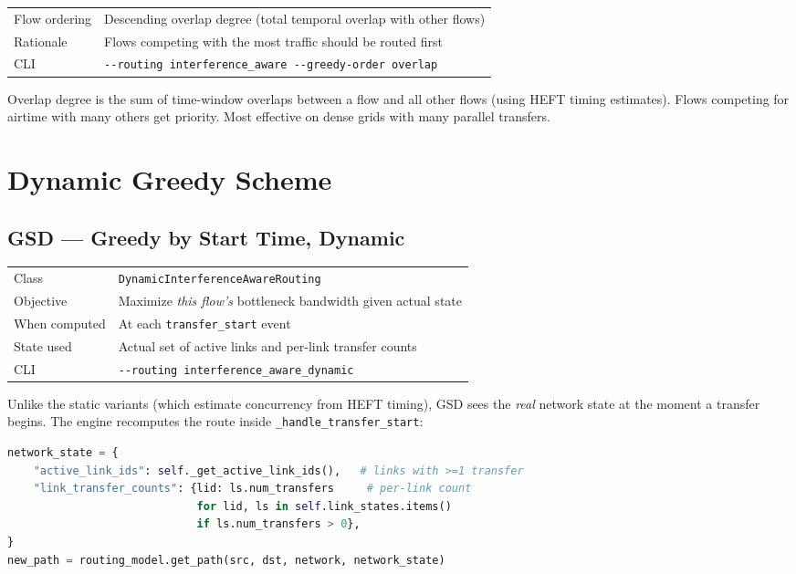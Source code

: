 \documentclass[11pt]{article}
\begin{document}
\begin{tabular}{@{}lp{9cm}@{}}
\toprule
Flow ordering & Descending overlap degree (total temporal overlap with other flows) \\
Rationale     & Flows competing with the most traffic should be routed first \\
CLI           & \texttt{-{}-routing interference\_aware -{}-greedy-order overlap} \\
\bottomrule
\end{tabular}

\medskip
Overlap degree is the sum of time-window overlaps between a flow and all
other flows (using HEFT timing estimates).  Flows competing for airtime with
many others get priority.  Most effective on dense grids with many parallel
transfers.

\section{Dynamic Greedy Scheme}

\subsection{GSD --- Greedy by Start Time, Dynamic}

\begin{tabular}{@{}lp{9cm}@{}}
\toprule
Class          & \texttt{DynamicInterferenceAwareRouting} \\
Objective      & Maximize \emph{this flow's} bottleneck bandwidth given actual state \\
When computed  & At each \texttt{transfer\_start} event \\
State used     & Actual set of active links and per-link transfer counts \\
CLI            & \texttt{-{}-routing interference\_aware\_dynamic} \\
\bottomrule
\end{tabular}

\medskip
Unlike the static variants (which estimate concurrency from HEFT timing),
GSD sees the \emph{real} network state at the moment a transfer begins.
The engine recomputes the route inside \texttt{\_handle\_transfer\_start}:

\begin{lstlisting}[language=Python]
network_state = {
    "active_link_ids": self._get_active_link_ids(),   # links with >=1 transfer
    "link_transfer_counts": {lid: ls.num_transfers     # per-link count
                             for lid, ls in self.link_states.items()
                             if ls.num_transfers > 0},
}
new_path = routing_model.get_path(src, dst, network, network_state)
\end{lstlisting}
\end{document}
